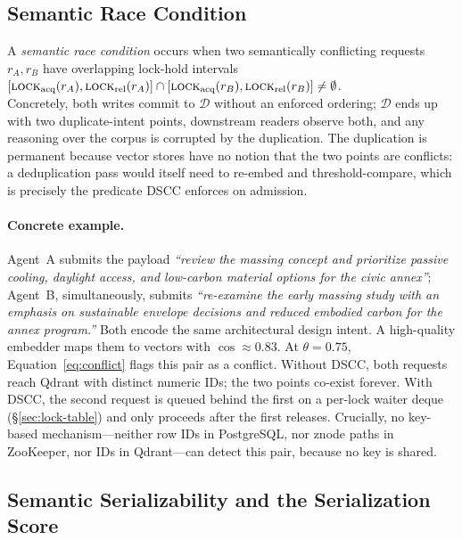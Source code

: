 \documentclass[sigconf]{acmart}
\begin{document}
\subsection{Semantic Race Condition}
\label{sec:race}

A \emph{semantic race condition} occurs when two semantically conflicting
requests $r_A,r_B$ have overlapping lock-hold intervals \\
$[\textsc{lock}_\textrm{acq}(r_A),\textsc{lock}_\textrm{rel}(r_A)]\cap
[\textsc{lock}_\textrm{acq}(r_B),\textsc{lock}_\textrm{rel}(r_B)]\neq\emptyset$. \\
Concretely, both writes commit to $\mathcal{D}$ without an enforced ordering;
$\mathcal{D}$ ends up with two duplicate-intent points, downstream readers
observe both, and any reasoning over the corpus is corrupted by the
duplication. The duplication is permanent because vector stores have no
notion that the two points are conflicts: a deduplication pass would
itself need to re-embed and threshold-compare, which is precisely the
predicate DSCC enforces on admission.

\paragraph{\textbf{Concrete example.}} Agent~A submits the payload \emph{``review
the massing concept and prioritize passive cooling, daylight access, and
low-carbon material options for the civic annex''}; Agent~B, simultaneously,
submits \emph{``re-examine the early massing study with an emphasis on
sustainable envelope decisions and reduced embodied carbon for the annex
program.''} Both encode the same architectural design intent. A high-quality
embedder maps them to vectors with $\cos\approx 0.83$. At $\theta{=}0.75$,
Equation~\ref{eq:conflict} flags this pair as a conflict. Without DSCC,
both requests reach Qdrant with distinct numeric IDs; the two points
co-exist forever. With DSCC, the second request is queued behind the first
on a per-lock waiter deque (\S\ref{sec:lock-table}) and only proceeds after
the first releases. Crucially, no key-based mechanism---neither row IDs in
PostgreSQL, nor znode paths in ZooKeeper, nor IDs in Qdrant---can detect
this pair, because no key is shared.

\subsection{Semantic Serializability and the Serialization Score}
\label{sec:semantic-ser}
\end{document}
